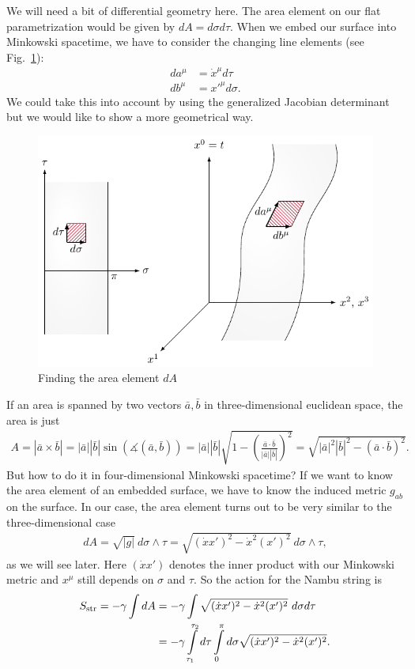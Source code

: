 We will need a bit of differential geometry here. The area element on our flat parametrization would be given by $dA = d\sigma d\tau$. When we embed our surface into Minkowski spacetime, we have to consider the changing line elements (see Fig.~\ref{fig:10}):
\begin{align}
da^{\mu} &= \dot{x}^{\mu} d\tau \\
db^{\mu} &= x'^{\mu} d\sigma.
\end{align}
We could take this into account by using the generalized Jacobian determinant but we would like to show a more geometrical way.
\begin{figure}[H]
\begin{center}
\includegraphics[scale=1.1]{img/string_area.pdf}
\end{center}
\caption{Finding the area element $dA$}
\label{fig:10}
\end{figure}
If an area is spanned by two vectors $\bar{a}, \bar{b}$ in three-dimensional euclidean space, the area is just
\begin{align}
A = |\bar{a} \times \bar{b}| = |\bar{a}| |\bar{b}| \sin(\measuredangle(\bar{a},\bar{b})) = |\bar{a}| |\bar{b}| \sqrt{1 - \left( \frac{\bar{a} \cdot \bar{b}}{|\bar{a}| |\bar{b}|} \right)^2} = \sqrt{|\bar{a}|^2 |\bar{b}|^2 - \left( \bar{a} \cdot \bar{b} \right)^2}.
\end{align}
But how to do it in four-dimensional Minkowski spacetime? If we want to know the area element of an embedded surface, we have to know the induced metric $g_{a b}$ on the surface. In our case, the area element turns out to be very similar to the three-dimensional case
\begin{align}
dA = \sqrt{|g|} \ d\sigma \wedge \tau = \sqrt{(\dot{x}x')^2 - \dot{x}^2(x')^2} \ d\sigma \wedge \tau,
\end{align}
as we will see later. Here $(\dot{x}x')$ denotes the inner product with our Minkowski metric and $x^{\mu}$ still depends on $\sigma$ and $\tau$. So the action for the Nambu string is
\begin{align}
S_{\text{str}} = - \gamma \int dA &= - \gamma \int \sqrt{(\dot{x}x')^2 - \dot{x}^2(x')^2} \ d\sigma d\tau \notag \\
&= - \gamma \displaystyle\int\limits_{\tau_1}^{\tau_2} d\tau \displaystyle\int\limits_{0}^{\pi} d\sigma \sqrt{(\dot{x}x')^2 - \dot{x}^2(x')^2}.
\end{align}


